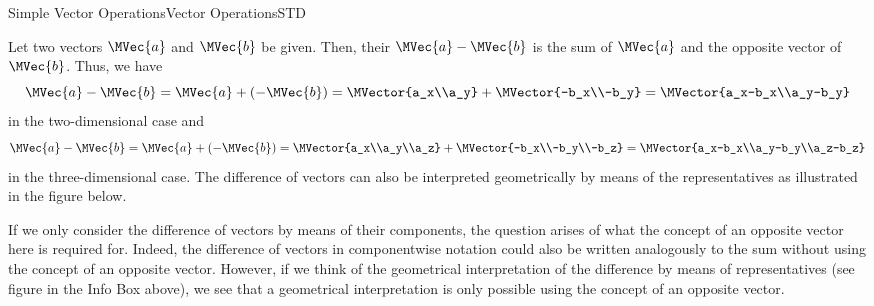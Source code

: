 \begin{MXContent}{Simple Vector Operations}{Vector Operations}{STD}
\begin{MInfo}
Let two vectors $\MVec{a}$ and $\MVec{b}$ be given. Then, their  
$\MVec{a}-\MVec{b}$ is the sum of $\MVec{a}$ and the opposite vector of $\MVec{b}$. Thus, we have
\[
 \MVec{a}-\MVec{b}=\MVec{a}+(-\MVec{b})=\MVector{a_x\\a_y}+\MVector{-b_x\\-b_y}=\MVector{a_x-b_x\\a_y-b_y}
\]
in the two-dimensional case and
\[
 \MVec{a}-\MVec{b}=\MVec{a}+(-\MVec{b})=\MVector{a_x\\a_y\\a_z}+\MVector{-b_x\\-b_y\\-b_z}=\MVector{a_x-b_x\\a_y-b_y\\a_z-b_z}
\]
in the three-dimensional case. The difference of vectors can also be interpreted geometrically by means 
of the representatives as illustrated in the figure below.
\begin{center}
% 
\end{center}
\end{MInfo}

If we only consider the difference of vectors by means of their components,
the question arises of what the concept of an opposite vector here is required for. 
Indeed, the difference of vectors in componentwise notation could also be written analogously to the sum 
without using the concept of an opposite vector. However, if we think of the geometrical interpretation 
of the difference by means of representatives (see figure in the Info Box above), we see that a geometrical 
interpretation is only possible using the concept of an opposite vector. 


\end{MXContent}
